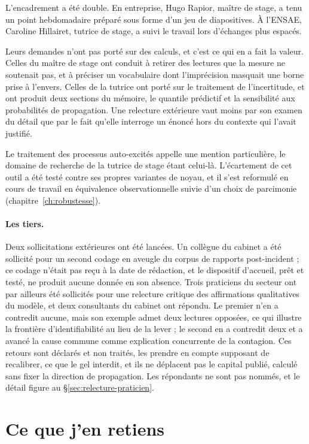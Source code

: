 L'encadrement a été double. En entreprise, Hugo Rapior, maître de stage, a tenu un
point hebdomadaire préparé sous forme d'un jeu de diapositives. À l'ENSAE, Caroline
Hillairet, tutrice de stage, a suivi le travail lors d'échanges plus espacés.

Leurs demandes n'ont pas porté sur des calculs, et c'est ce qui en a fait la valeur.
Celles du maître de stage ont conduit à retirer des lectures que la mesure ne
soutenait pas, et à préciser un vocabulaire dont l'imprécision masquait une borne
prise à l'envers. Celles de la tutrice ont porté sur le traitement de l'incertitude,
et ont produit deux sections du mémoire, le quantile prédictif et la sensibilité aux
probabilités de propagation. Une relecture extérieure vaut moins par son examen du
détail que par le fait qu'elle interroge un énoncé hors du contexte qui l'avait
justifié.

Le traitement des processus auto-excités appelle une mention particulière, le
domaine de recherche de la tutrice de stage étant celui-là. L'écartement de cet
outil a été testé contre ses propres variantes de noyau, et il s'est reformulé en
cours de travail en équivalence observationnelle suivie d'un choix de parcimonie
(chapitre~\ref{ch:robustesse}).

\paragraph{Les tiers.} Deux sollicitations extérieures ont été lancées. Un collègue
du cabinet a été sollicité pour un second codage en aveugle du corpus de rapports
post-incident ; ce codage n'était pas reçu à la date de rédaction, et le dispositif
d'accueil, prêt et testé, ne produit aucune donnée en son absence. Trois praticiens
du secteur ont par ailleurs été sollicités pour une relecture critique des
affirmations qualitatives du modèle, et deux consultants du cabinet ont répondu. Le
premier n'en a contredit aucune, mais son exemple admet deux lectures opposées, ce
qui illustre la frontière d'identifiabilité au lieu de la lever ; le second en a
contredit deux et a avancé la cause commune comme explication concurrente de la
contagion. Ces retours sont déclarés et non traités, les prendre en compte supposant
de recalibrer, ce que le gel interdit, et ils ne déplacent pas le capital publié,
calculé sans fixer la direction de propagation. Les répondants ne sont pas nommés,
et le détail figure au \S\ref{sec:relecture-praticien}.

\section{Ce que j'en retiens}
\label{ens:retiens}

